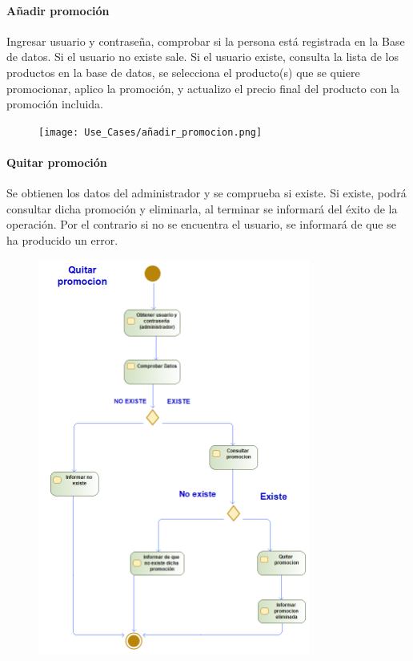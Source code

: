 \paragraph{Añadir promoción}
Ingresar usuario y contraseña, comprobar si la persona está registrada en la Base de datos. Si el usuario no existe sale. Si el usuario existe, consulta la lista de los productos en la base de datos, se selecciona el producto(s) que se quiere promocionar, aplico la promoción, y actualizo el precio final del producto con la promoción incluida.
\begin{figure}[H]
    \centering
    \texttt{[image: Use\_Cases/añadir\_promocion.png]}
\end{figure}
\paragraph{Quitar promoción}
Se obtienen los datos del administrador y se comprueba si existe. Si existe, podrá consultar dicha promoción y eliminarla, al terminar se informará del éxito de la operación. Por el contrario si no se encuentra el usuario, se informará de que se ha producido un error.
\begin{figure}[H]
    \centering
    \includegraphics[width=0.8\textwidth]{Use_Cases/quitar_promocion.png}
\end{figure}
